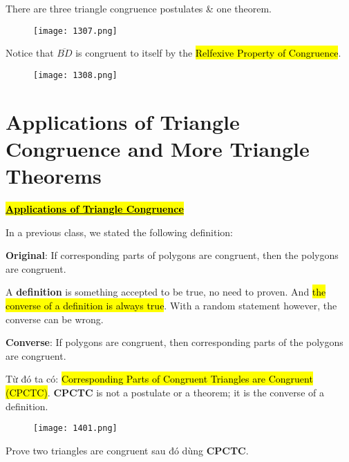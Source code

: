 There are three triangle congruence postulates \& one theorem.

\newpage

\begin{figure}[htb!]
  \centering
  \texttt{[image: 1307.png]}
\end{figure}

Notice that $\overline{BD}$ is congruent to itself by the \hl{Relfexive Property of Congruence}.

\newpage

\begin{figure}[htb!]
  \centering
  \texttt{[image: 1308.png]}
\end{figure}

\section{Applications of Triangle Congruence and More Triangle Theorems}

\vspace{.4cm}

\centerline{\underline{\hl{\textbf{\Large Applications of Triangle Congruence}}}}

In a previous class, we stated the following definition:

\textbf{Original}: If corresponding parts of polygons are congruent, then the polygons are congruent.

A \textbf{definition} is something accepted to be true, no need to proven. And \hl{the converse of a definition is always true}. With a random statement however, the converse can be wrong.

\textbf{Converse}: If polygons are congruent, then corresponding parts of the polygons are congruent.

Từ đó ta có: \hl{Corresponding Parts of Congruent Triangles are Congruent (CPCTC)}. \textbf{CPCTC} is not a postulate or a theorem; it is the converse of a definition.

\newpage

\begin{figure}[htb!]
  \centering
  \texttt{[image: 1401.png]}
\end{figure}

Prove two triangles are congruent sau đó dùng \textbf{CPCTC}.

